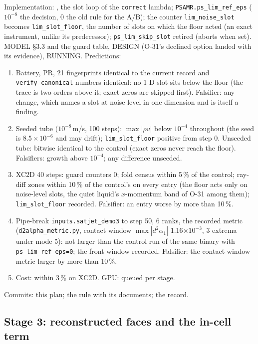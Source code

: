 \documentclass[11pt,a4paper]{article}
\newcommand{\code}[1]{\texttt{\small #1}}
\begin{document}
Implementation: , the slot loop of the \code{correct}
lambda; \code{PSAMR.ps\_lim\_ref\_eps} ($10^{-8}$ the decision, 0 the old
rule for the A/B); the counter \code{lim\_noise\_slot} becomes
\code{lim\_slot\_floor}, the number of slots on which the floor acted
(an exact instrument, unlike its predecessor); \code{ps\_lim\_skip\_slot}
retired (aborts when set).  MODEL \S3.3 and the guard table, DESIGN
(O-31's declined option landed with its evidence), RUNNING.  Predictions:
\begin{enumerate}[nosep]
\item Battery, PR, 21 fingerprints identical to the current record and
      \code{verify\_canonical} numbers identical: no 1-D slot sits below
      the floor (the trace is two orders above it; exact zeros are
      skipped first).  Falsifier: any change, which names a slot at noise
      level in one dimension and is itself a finding.
\item Seeded tube ($10^{-8}$\,m/s, 100 steps): $\max|\rho v|$ below
      $10^{-4}$ throughout (the seed is $8.5\times10^{-6}$ and may drift);
      \code{lim\_slot\_floor} positive from step 0.  Unseeded tube: bitwise
      identical to the control (exact zeros never reach the floor).
      Falsifiers: growth above $10^{-4}$; any difference unseeded.
\item XC2D 40 steps: guard counters 0; fold census within 5\,\% of the
      control; ray-diff zones within 10\,\% of the control's on every
      entry (the floor acts only on noise-level slots, the quiet liquid's
      $x$-momentum band of O-31 among them); \code{lim\_slot\_floor}
      recorded.  Falsifier: an entry worse by more than 10\,\%.
\item Pipe-break \code{inputs.satjet\_demo3} to step 50, 6 ranks, the
      recorded metric (\code{d2alpha\_metric.py}, contact window
      $\max|d^2\alpha_1|$ 1.16$\times10^{-3}$, 3 extrema under mode 5): not
      larger than the control run of the same binary with
      \code{ps\_lim\_ref\_eps=0}; the front window recorded.  Falsifier:
      the contact-window metric larger by more than 10\,\%.
\item Cost: within 3\,\% on XC2D.  GPU: queued per stage.
\end{enumerate}
Commits: this plan; the rule with its documents; the record.

\subsection*{Stage 3: reconstructed faces and the in-cell term}
\end{document}
